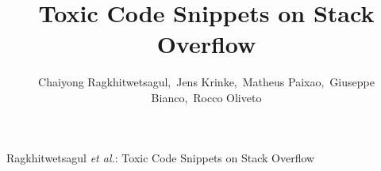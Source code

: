 \documentclass[10pt,journal,compsoc]{IEEEtran}
\begin{document}
\title{Toxic Code Snippets on Stack Overflow}

\author{Chaiyong Ragkhitwetsagul,~Jens Krinke,~Matheus Paixao,~Giuseppe Bianco,~Rocco Oliveto}

%
{Ragkhitwetsagul \MakeLowercase{\textit{et al.}}: Toxic Code Snippets on Stack Overflow}
% 

\end{document}
